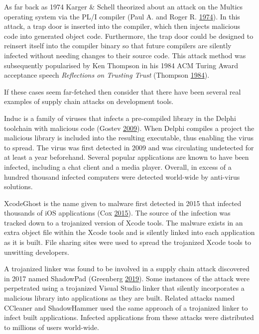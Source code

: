 \documentclass[a4paper,]{report}
\begin{document}
As far back as 1974 Karger \& Schell theorized about an attack on the
Multics operating system via the PL/I compiler (Paul A. and Roger R.
\protect\hyperlink{ref-Karger1974}{1974}). In this attack, a trap door
is inserted into the compiler, which then injects malicious code into
generated object code. Furthermore, the trap door could be designed to
reinsert itself into the compiler binary so that future compilers are
silently infected without needing changes to their source code. This
attack method was subsequently popularised by Ken Thompson in his 1984
ACM Turing Award acceptance speech \emph{Reflections on Trusting Trust}
(Thompson \protect\hyperlink{ref-Thompson1984}{1984}).

If these cases seem far-fetched then consider that there have been
several real examples of supply chain attacks on development tools.

Induc is a family of viruses that infects a pre-compiled library in the
Delphi toolchain with malicious code (Gostev
\protect\hyperlink{ref-Gostev2009}{2009}). When Delphi compiles a
project the malicious library is included into the resulting executable,
thus enabling the virus to spread. The virus was first detected in 2009
and was circulating undetected for at least a year beforehand. Several
popular applications are known to have been infected, including a chat
client and a media player. Overall, in excess of a hundred thousand
infected computers were detected world-wide by anti-virus solutions.

XcodeGhost is the name given to malware first detected in 2015 that
infected thousands of iOS applications (Cox
\protect\hyperlink{ref-Cox2015}{2015}). The source of the infection was
tracked down to a trojanized version of Xcode tools. The malware exists
in an extra object file within the Xcode tools and is silently linked
into each application as it is built. File sharing sites were used to
spread the trojanized Xcode tools to unwitting developers.

A trojanized linker was found to be involved in a supply chain attack
discovered in 2017 named ShadowPad (Greenberg
\protect\hyperlink{ref-Greenberg2019}{2019}). Some instances of the
attack were perpetrated using a trojanized Visual Studio linker that
silently incorporates a malicious library into applications as they are
built. Related attacks named CCleaner and ShadowHammer used the same
approach of a trojanized linker to infect built applications. Infected
applications from these attacks were distributed to millions of users
world-wide.
\end{document}
